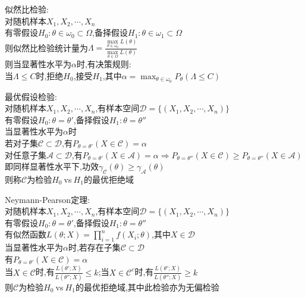 \begin{dingyi}
似然比检验:\\
对随机样本$X_1,X_2,\cdots,X_n$\\
有零假设$H_0:\theta\in\omega_0\subset\Omega$,备择假设$H_1:\theta\in\omega_1\subset\Omega$\\
则似然比检验统计量为$\Lambda=\frac{\max\limits_{\theta\in\omega_0}L(\theta)}{\max\limits_{\theta\in\Omega}L(\theta)}$\\
则当显著性水平为$\alpha$时,有决策规则:\\
当$\Lambda\leq C$时,拒绝$H_0$,接受$H_1$,其中$\alpha=\max_{\theta\in\omega_0}P_{\theta}(\Lambda\leq C)$
\end{dingyi}

\begin{dingyi}
最优假设检验:\\
对随机样本$X_1,X_2,\cdots,X_n$,有样本空间$\mathcal{D}=\{(X_1,X_2,\cdots,X_n)\}$\\
有零假设$H_0:\theta=\theta'$,备择假设$H_1:\theta=\theta''$\\
当显著性水平为$\alpha$时\\
若对子集$\mathcal{C}\subset\mathcal{D}$,有$P_{\theta=\theta'}(X\in \mathcal{C})=\alpha$\\
对任意子集$\mathcal{A}\subset\mathcal{D}$,有$P_{\theta=\theta'}(X\in \mathcal{A})=\alpha\Rightarrow P_{\theta=\theta''}(X\in \mathcal{C})\geq P_{\theta=\theta''}(X\in \mathcal{A})$\\
即同样显著性水平下,功效$\gamma_{\mathcal{C}}(\theta)\geq\gamma_{\mathcal{A}}(\theta)$\\
则称$\mathcal{C}$为检验$H_0\ $vs$\ H_1$的最优拒绝域
\end{dingyi}

\begin{dingli}
Neymann-Pearson定理:\\
对随机样本$X_1,X_2,\cdots,X_n$,有样本空间$\mathcal{D}=\{(X_1,X_2,\cdots,X_n)\}$\\
有零假设$H_0:\theta=\theta'$,备择假设$H_1:\theta=\theta''$\\
有似然函数$L(\theta;X)=\prod\limits_{i=1}^{n}f(X_i;\theta)$,其中$X\in\mathcal{D}$\\
当显著性水平为$\alpha$时,若存在子集$\mathcal{C}\subset\mathcal{D}$\\
有$P_{\theta=\theta'}(X\in\mathcal{C})=\alpha$\\
当$X\in\mathcal{C}$时,有$\frac{L(\theta';X)}{L(\theta'';X)}\leq k$;当$X\in\mathcal{C}^{c}$时,有$\frac{L(\theta';X)}{L(\theta'';X)}\geq k$\\
则$\mathcal{C}$为检验$H_0\ $vs$\ H_1$的最优拒绝域,其中此检验亦为无偏检验
\end{dingli}

